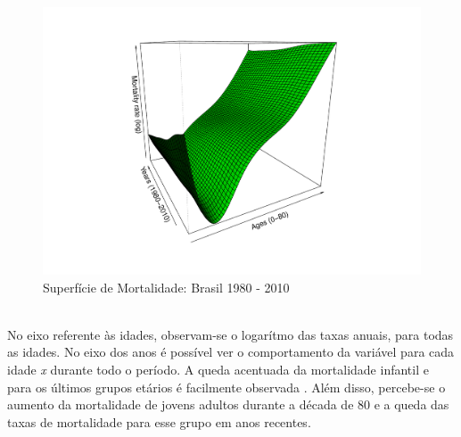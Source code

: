 \documentclass[12pt, 						%
			openright, 					%
			twoside,					%
			a4paper,x					%
			english,					%
			brazil]{abntex2}				%
\begin{document}
		\begin{figure}[!htb]
		\caption{\label{fig1} Superfície de Mortalidade: Brasil 1980 - 2010}
		\begin{center}
			\includegraphics[scale = 0.4]{Graphs/MortalitySurface.pdf}
		\end{center}
		\end{figure} \\
		No eixo referente às idades, observam-se o logarítmo das taxas anuais, para todas as idades. No eixo dos anos é possível ver o comportamento da variável para cada idade \textit{x} durante todo o período. A queda acentuada da mortalidade infantil e para os últimos grupos etários é facilmente observada \cite{brito2008transiccao, brito2010reinvenccao}. Além disso, percebe-se o aumento da mortalidade de jovens adultos durante a década de 80 \cite{araujo1998mortalidade} e a queda das taxas de mortalidade para esse grupo em anos recentes. 
\end{document}
